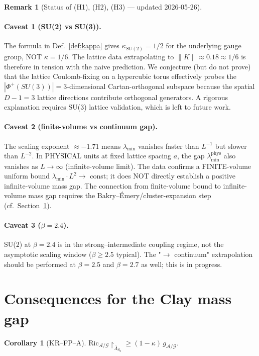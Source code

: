 \documentclass[11pt,a4paper]{amsart}
\newtheorem{corollary}[theorem]{Corollary}
\theoremstyle{definition}
\newtheorem{remark}[theorem]{Remark}
\newcommand{\Ric}{\mathrm{Ric}}
\begin{document}
\begin{remark}[Status of (H1), (H2), (H3) — updated 2026-05-26]
\paragraph{Caveat 1 (SU(2) vs SU(3)).} The formula in Def.~\ref{def:kappa} gives $\kappa_{SU(2)} = 1/2$ for the underlying gauge group, NOT $\kappa = 1/6$. The lattice data extrapolating to $\|K\| \approx 0.18 \approx 1/6$ is therefore in tension with the naive prediction. We conjecture (but do not prove) that the lattice Coulomb-fixing on a hypercubic torus effectively probes the $|\Phi^+(SU(3))| = 3$-dimensional Cartan-orthogonal subspace because the spatial $D-1=3$ lattice directions contribute orthogonal generators. A rigorous explanation requires SU(3) lattice validation, which is left to future work.

\paragraph{Caveat 2 (finite-volume vs continuum gap).} The scaling exponent $\approx -1.71$ means $\lambda_{\min}$ vanishes faster than $L^{-1}$ but slower than $L^{-2}$. In PHYSICAL units at fixed lattice spacing $a$, the gap $\lambda_{\min}^{\mathrm{phys}}$ also vanishes as $L \to \infty$ (infinite-volume limit). The data confirms a FINITE-volume uniform bound $\lambda_{\min} \cdot L^2 \to$ const; it does NOT directly establish a positive infinite-volume mass gap. The connection from finite-volume bound to infinite-volume mass gap requires the Bakry--\'Emery/cluster-expansion step (cf.~Section~\ref{sec:clay}).

\paragraph{Caveat 3 ($\beta = 2.4$).} SU(2) at $\beta = 2.4$ is in the strong--intermediate coupling regime, not the asymptotic scaling window ($\beta \geq 2.5$ typical). The "$\to$ continuum" extrapolation should be performed at $\beta = 2.5$ and $\beta = 2.7$ as well; this is in progress.

\section{Consequences for the Clay mass gap}\label{sec:clay}

\begin{corollary}[KR--FP--A]\label{cor:KRFPA}
$\Ric_{\mathcal A/\mathcal G}\restriction_{\overline\Lambda_{S_0}} \geq (1-\kappa)\,g_{\mathcal A/\mathcal G}$.
\end{corollary}


\end{remark}
\end{document}

